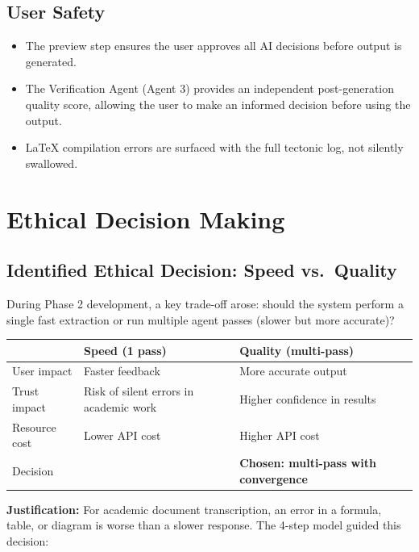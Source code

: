 \documentclass[12pt,a4paper]{article}
\begin{document}
\subsection{User Safety}
\begin{itemize}[noitemsep]
  \item The preview step ensures the user approves all AI decisions before output is generated.
  \item The Verification Agent (Agent 3) provides an independent post-generation quality score,
    allowing the user to make an informed decision before using the output.
  \item LaTeX compilation errors are surfaced with the full tectonic log, not silently swallowed.
\end{itemize}


\section{Ethical Decision Making}

\subsection{Identified Ethical Decision: Speed vs.\ Quality}

During Phase 2 development, a key trade-off arose: should the system perform a single fast
extraction or run multiple agent passes (slower but more accurate)?

\begin{center}
\begin{tabular}{lp{5cm}p{5cm}}
  \toprule
  & \textbf{Speed (1 pass)} & \textbf{Quality (multi-pass)} \\
  \midrule
  User impact   & Faster feedback & More accurate output \\
  Trust impact  & Risk of silent errors in academic work & Higher confidence in results \\
  Resource cost & Lower API cost & Higher API cost \\
  Decision      & & \textbf{Chosen: multi-pass with convergence} \\
  \bottomrule
\end{tabular}
\end{center}

\textbf{Justification:} For academic document transcription, an error in a formula, table, or
diagram is worse than a slower response. The 4-step model guided this decision:
\end{document}
